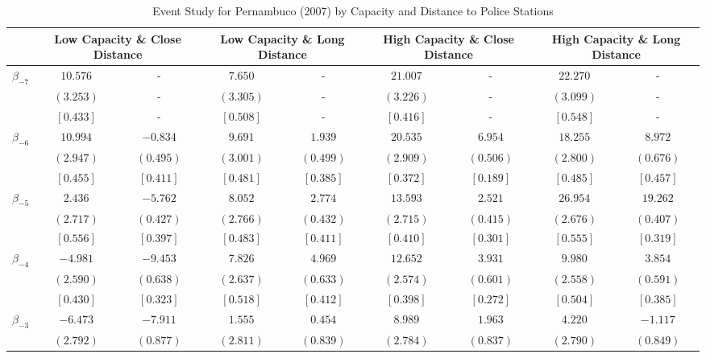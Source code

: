 \documentclass[12pt]{article}
\begin{document}
\begin{table}[h!]
\centering
\caption{Event Study for Pernambuco (2007) by Capacity and Distance to Police Stations}
\label{tab:event_study_PE_het}
\begin{adjustbox}{width=\textwidth}
\begin{tabular}{lcccccccc}
\toprule
& \multicolumn{2}{c}{Low Capacity \& Close Distance} & \multicolumn{2}{c}{Low Capacity \& Long Distance} & \multicolumn{2}{c}{High Capacity \& Close Distance} & \multicolumn{2}{c}{High Capacity \& Long Distance} \\
\cmidrule(lr){2-3} \cmidrule(lr){4-5} \cmidrule(lr){6-7} \cmidrule(lr){8-9}
\midrule
 $\beta_{-7}$ & $ 10.576$ & - & $  7.650$ & - & $ 21.007$ & - & $ 22.270$ & - \\
& $(  3.253)$ & - & $(  3.305)$ & - & $(  3.226)$ & - & $(  3.099)$ & - \\
& $[  0.433]$ & - & $[  0.508]$ & - & $[  0.416]$ & - & $[  0.548]$ & - \\
 $\beta_{-6}$ & $ 10.994$ & $ -0.834$ & $  9.691$ & $  1.939$ & $ 20.535$ & $  6.954$ & $ 18.255$ & $  8.972$ \\
& $(  2.947)$ & $(  0.495)$ & $(  3.001)$ & $(  0.499)$ & $(  2.909)$ & $(  0.506)$ & $(  2.800)$ & $(  0.676)$ \\
& $[  0.455]$ & $[  0.411]$ & $[  0.481]$ & $[  0.385]$ & $[  0.372]$ & $[  0.189]$ & $[  0.485]$ & $[  0.457]$ \\
 $\beta_{-5}$ & $  2.436$ & $ -5.762$ & $  8.052$ & $  2.774$ & $ 13.593$ & $  2.521$ & $ 26.954$ & $ 19.262$ \\
& $(  2.717)$ & $(  0.427)$ & $(  2.766)$ & $(  0.432)$ & $(  2.715)$ & $(  0.415)$ & $(  2.676)$ & $(  0.407)$ \\
& $[  0.556]$ & $[  0.397]$ & $[  0.483]$ & $[  0.411]$ & $[  0.410]$ & $[  0.301]$ & $[  0.555]$ & $[  0.319]$ \\
 $\beta_{-4}$ & $ -4.981$ & $ -9.453$ & $  7.826$ & $  4.969$ & $ 12.652$ & $  3.931$ & $  9.980$ & $  3.854$ \\
& $(  2.590)$ & $(  0.638)$ & $(  2.637)$ & $(  0.633)$ & $(  2.574)$ & $(  0.601)$ & $(  2.558)$ & $(  0.591)$ \\
& $[  0.430]$ & $[  0.323]$ & $[  0.518]$ & $[  0.412]$ & $[  0.398]$ & $[  0.272]$ & $[  0.504]$ & $[  0.385]$ \\
 $\beta_{-3}$ & $ -6.473$ & $ -7.911$ & $  1.555$ & $  0.454$ & $  8.989$ & $  1.963$ & $  4.220$ & $ -1.117$ \\
& $(  2.792)$ & $(  0.877)$ & $(  2.811)$ & $(  0.839)$ & $(  2.784)$ & $(  0.837)$ & $(  2.790)$ & $(  0.849)$ \\

\end{tabular}
\end{adjustbox}
\end{table}
\end{document}
